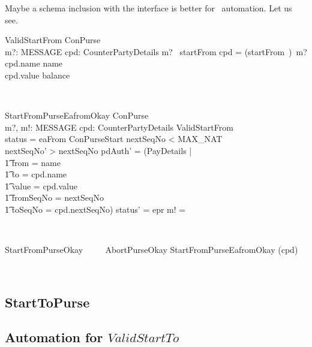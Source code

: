Maybe a schema inclusion with the interface is better for \zeves\ automation.
Let us see.
\begin{LSDef}
\begin{schema}{ValidStartFrom}
   ConPurse \\
   m?: MESSAGE
   \also
   cpd: CounterPartyDetails
\where
   m? \in \ran~startFrom
   \also
   cpd = (startFrom~\inv)~m?
   \also
   cpd.name \neq name \\
   cpd.value \leq balance
\end{schema}~\end{LSDef}

\begin{LSDef}
\begin{schema}{StartFromPurseEafromOkay}
   \Delta ConPurse \\
   m?, m!: MESSAGE
   \also
   cpd: CounterPartyDetails
\where
   ValidStartFrom \\
   status = eaFrom
   \also
   \Xi ConPurseStart
   \also
   nextSeqNo < MAX\_NAT \\
   nextSeqNo' > nextSeqNo
   \also
   pdAuth' = (\mu PayDetails | \\
      \t1 from = name \\
      \t1 \land to = cpd.name \\
      \t1 \land value = cpd.value \\
      \t1 \land fromSeqNo = nextSeqNo \\
      \t1 \land toSeqNo = cpd.nextSeqNo)
   \also
   status' = epr
   \also
   m! = \bot
\end{schema}~\end{LSDef}

\begin{LSDef}
\begin{zed}
   StartFromPurseOkay ~~~~ AbortPurseOkay \semi StartFromPurseEafromOkay \hide (cpd)
\end{zed}~\end{LSDef}

\subsection{StartToPurse}

\subsection*{Automation for $ValidStartTo$}

